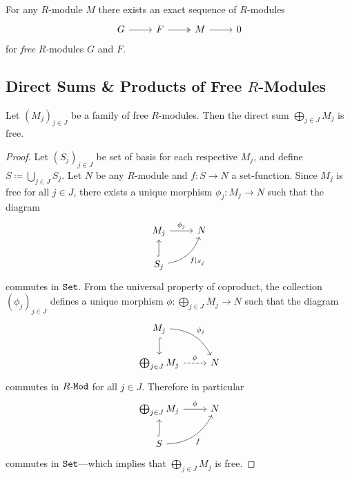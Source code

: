 \begin{corollary}
    \label{cor:any-module-is-quotient-of-free-module}
    For any \(R\)-module \(M\) there exists an exact sequence of \(R\)-modules
    \[
        \begin{tikzcd}
            G \ar[r] &F \ar[r, two heads] &M \ar[r] &0
        \end{tikzcd}
    \]
    for \emph{free} \(R\)-modules \(G\) and \(F\).
\end{corollary}

\subsection{Direct Sums \& Products of Free \texorpdfstring{\(R\)}{R}-Modules}

\begin{proposition}
    \label{prop:direct-sum-mod-free}
    Let \((M_j)_{j \in J}\) be a family of free \(R\)-modules. Then the direct sum
    \(\bigoplus_{j \in J} M_j\) is free.
\end{proposition}

\begin{proof}
    Let \((S_j)_{j \in J}\) be set of basis for each respective \(M_j\), and define
    \(S \coloneq \bigcup_{j \in J} S_j\). Let \(N\) be any \(R\)-module and \(f: S
    \to N\) a set-function. Since \(M_j\) is free for all \(j \in J\), there exists
    a unique morphism \(\phi_j: M_j \to N\) such that the diagram
    \[
        \begin{tikzcd}
            M_j \ar[r, "\phi_j"] &N \\
            S_j \ar[u, hook] \ar[ru, "f|_{S_j}"', bend right]
        \end{tikzcd}
    \]
    commutes in \({\texttt{Set}}\). From the universal property of coproduct, the collection
    \((\phi_j)_{j \in J}\) defines a unique morphism \(\phi: \bigoplus_{j \in J} M_j
    \to N\) such that the diagram
    \[
        \begin{tikzcd}
            M_j \ar[d, hook] \ar[rd, bend left, "\phi_j"] & \\
            \bigoplus_{j \in J} M_j \ar[r, dashed, "\phi"] &N
        \end{tikzcd}
    \]
    commutes in \({R\text{-}\texttt{Mod}}\) for all \(j \in J\). Therefore in particular
    \[
        \begin{tikzcd}
            \bigoplus_{j \in J} M_j \ar[r, "\phi"] & N \\
            S \ar[u, hook] \ar[ru, bend right, "f"'] &
        \end{tikzcd}
    \]
    commutes in \({\texttt{Set}}\)---which implies that \(\bigoplus_{j \in J} M_j\) is free.
\end{proof}

